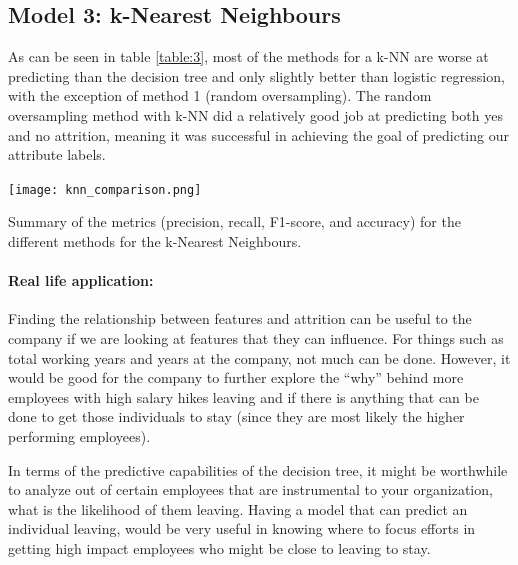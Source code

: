 \documentclass{article}
\begin{document}
\subsection{Model 3: k-Nearest Neighbours}
\vspace{-2mm} 
As can be seen in table \ref{table:3}, most of the methods for a k-NN are worse at predicting than the decision tree and only slightly better than logistic regression, with the exception of method 1 (random oversampling). The random oversampling method with k-NN did a relatively good job at predicting both yes and no attrition, meaning it was successful in achieving the goal of predicting our attribute labels.
\begin{table}[h]
\texttt{[image: knn\_comparison.png]}
\vspace{2mm} 
\caption{Summary of the metrics (precision, recall, F1-score, and accuracy) for the different methods for the k-Nearest Neighbours.}
\label{table:3} 
\vspace{-7mm}%
\end{table}

\paragraph{Real life application:} Finding the relationship between features and attrition can be useful to the company if we are looking at features that they can influence. For things such as total working years and years at the company, not much can be done. However, it would be good for the company to further explore the “why” behind more employees with high salary hikes leaving and if there is anything that can be done to get those individuals to stay (since they are most likely the higher performing employees). 

In terms of the predictive capabilities of the decision tree, it might be worthwhile to analyze out of certain employees that are instrumental to your organization, what is the likelihood of them leaving. Having a model that can predict an individual leaving, would be very useful in knowing where to focus efforts in getting high impact employees who might be close to leaving to stay.
\end{document}
